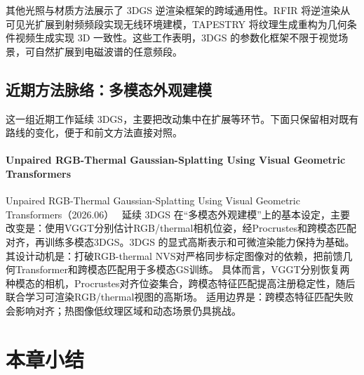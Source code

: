 \begin{takeaway}
其他光照与材质方法展示了 3DGS 逆渲染框架的跨域通用性。RFIR 将逆渲染从可见光扩展到射频频段实现无线环境建模，TAPESTRY 将纹理生成重构为几何条件视频生成实现 3D 一致性。这些工作表明，3DGS 的参数化框架不限于视觉场景，可自然扩展到电磁波谱的任意频段。
\end{takeaway}


\subsection{近期方法脉络：多模态外观建模}

这一组近期工作延续 3DGS，主要把改动集中在扩展等环节。下面只保留相对既有路线的变化，便于和前文方法直接对照。

\paragraph{Unpaired RGB-Thermal Gaussian-Splatting Using Visual Geometric Transformers}
Unpaired RGB-Thermal Gaussian-Splatting Using Visual Geometric Transformers（2026.06）~\cite{2606_05491} 延续 3DGS 在“多模态外观建模”上的基本设定，主要改变是：使用VGGT分别估计RGB/thermal相机位姿，经Procrustes和跨模态匹配对齐，再训练多模态3DGS。3DGS 的显式高斯表示和可微渲染能力保持为基础。
其设计动机是：打破RGB-thermal NVS对严格同步标定图像对的依赖，把前馈几何Transformer和跨模态匹配用于多模态GS训练。
具体而言，VGGT分别恢复两种模态的相机，Procrustes对齐位姿集合，跨模态特征匹配提高注册稳定性，随后联合学习可渲染RGB/thermal视图的高斯场。
适用边界是：跨模态特征匹配失败会影响对齐；热图像低纹理区域和动态场景仍具挑战。



\section*{本章小结}

